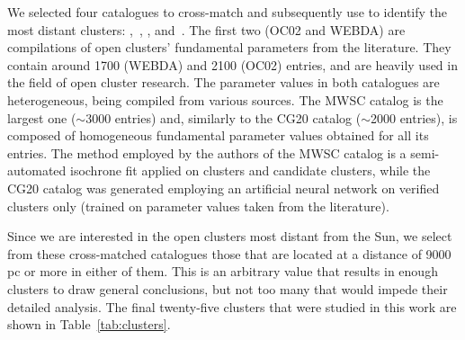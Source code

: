 \documentclass{aa}
\begin{document}
 We selected four catalogues to cross-match and subsequently use to identify the
 most distant clusters: \citet[][New Catalog of Optically Visible Open Clusters
 and Candidates, hereinafter OC02]{Dias_2002},~\citet[][hereinafter
 WEBDA\footnote{\url{https://webda.physics.muni.cz/}}]{Netopil_2012},
 \citet[][Milky Way Star Clusters Catalog, hereinafter MWSC]{Kharchenko_2012},
 and~\citet[][hereinafter CG20]{Cantat_2020}.
 The first two (OC02 and WEBDA) are compilations of open clusters' fundamental
 parameters from the literature. They contain around 1700 (WEBDA) and 2100 
 (OC02) entries, and are heavily used in the field of open cluster research.
 The parameter values in both catalogues are heterogeneous, being compiled from
 various sources.
 The MWSC catalog is the largest one ($\sim$3000 entries) and, similarly to the
 CG20 catalog ($\sim$2000 entries), is composed of homogeneous fundamental
 parameter values obtained for all its entries.
 The method employed by the authors of the MWSC catalog is a semi-automated
 isochrone fit applied on clusters and candidate clusters, while the
 CG20 catalog was generated employing an artificial neural network on
 verified clusters only (trained on parameter values taken from the
 literature).

 Since we are interested in the open clusters most distant from the Sun, we
 select from these cross-matched catalogues those that are located at a
 distance of 9000 pc or more in either of them. This is an arbitrary value that
 results in enough clusters to draw general conclusions, but not too many that
 would impede their detailed analysis. The final twenty-five clusters that were
 studied in this work are shown in Table~\ref{tab:clusters}.\\
\end{document}
